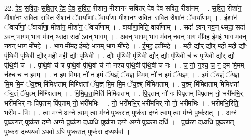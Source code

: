 \documentclass[17pt]{extarticle}
\begin{document}
22. दे॒व॒ स॒वि॒तः॒ स॒वि॒त॒र् दे॒व॒ दे॒व॒ स॒वि॒त॒ रीशा॑न॒ मीशा॑नꣳ सवितर् देव देव सवित॒ रीशा॑नम् । . स॒वि॒त॒ रीशा॑न॒ मीशा॑नꣳ सवितः सवित॒ रीशा॑नं॒ ॅवार्या॑णां॒ ॅवार्या॑णा॒ मीशा॑नꣳ सवितः सवित॒ रीशा॑नं॒ ॅवार्या॑णाम् । . ईशा॑नं॒ ॅवार्या॑णां॒ ॅवार्या॑णा॒ मीशा॑न॒ मीशा॑नं॒ ॅवार्या॑णाम् । . वार्या॑णा॒मिति॒ वार्या॑णाम् । . सदा॑ ऽवन् नव॒न् थ्सदा॒ सदा॑ ऽवन् भा॒गम् भा॒ग म॑व॒न् थ्सदा॒ सदा॑ ऽवन् भा॒गम् । . अ॒व॒न् भा॒गम् भा॒ग म॑वन् नवन् भा॒ग मी॑मह ईमहे भा॒ग म॑वन् नवन् भा॒ग मी॑महे । . भा॒ग मी॑मह ईमहे भा॒गम् भा॒ग मी॑महे । . ई॒म॒ह॒ इती॑महे । . म॒ही द्यौर् द्यौर् म॒ही म॒ही द्यौः पृ॑थि॒वी पृ॑थि॒वी द्यौर् म॒ही म॒ही द्यौः पृ॑थि॒वी । . द्यौः पृ॑थि॒वी पृ॑थि॒वी द्यौर् द्यौः पृ॑थि॒वी च॑ च पृथि॒वी द्यौर् द्यौः पृ॑थि॒वी च॑ । . पृ॒थि॒वी च॑ च पृथि॒वी पृ॑थि॒वी च॑ नो नश्च पृथि॒वी पृ॑थि॒वी च॑ नः । . च॒ नो॒ न॒श्च॒ च॒ न॒ इ॒म मि॒मम् न॑श्च च न इ॒मम् । . न॒ इ॒म मि॒मम् नो॑ न इ॒मं ॅय॒ज्ञ्ं ॅय॒ज्ञ् मि॒मम् नो॑ न इ॒मं ॅय॒ज्ञ्म् । . इ॒मं ॅय॒ज्ञ्ं ॅय॒ज्ञ् मि॒म मि॒मं ॅय॒ज्ञ्म् मि॑मिक्षताम् मिमिक्षतां ॅय॒ज्ञ् मि॒म मि॒मं ॅय॒ज्ञ्म् 
मि॑मिक्षताम् । . य॒ज्ञ्म् मि॑मिक्षताम् मिमिक्षतां ॅय॒ज्ञ्ं ॅय॒ज्ञ्म् मि॑मिक्षताम् । . मि॒मि॒क्ष॒ता॒मिति॑ मिमिक्षताम् । . पि॒पृ॒ताम् नो॑ नः पिपृ॒ताम् पि॑पृ॒ताम् नो॒ भरी॑मभि॒र् भरी॑मभिर् नः पिपृ॒ताम् पि॑पृ॒ताम् नो॒ भरी॑मभिः । . नो॒ भरी॑मभि॒र् भरी॑मभिर् नो नो॒ भरी॑मभिः । . भरी॑मभि॒रिति॒ भरी॑म - भिः॒ । . त्वा म॑ग्ने अग्ने॒ त्वाम् त्वा म॑ग्ने॒ पुष्क॑रा॒त् पुष्क॑रा दग्ने॒ त्वाम् त्वा म॑ग्ने॒ पुष्क॑रात् । . अ॒ग्ने॒ पुष्क॑रा॒त् पुष्क॑रा दग्ने अग्ने॒ पुष्क॑रा॒ दध्यधि॒ पुष्क॑रा दग्ने अग्ने॒ पुष्क॑रा॒ दधि॑ । . पुष्क॑रा॒ दध्यधि॒ पुष्क॑रा॒त् पुष्क॑रा॒ दध्यथ॒र्वा ऽथ॒र्वा ऽधि॒ पुष्क॑रा॒त् पुष्क॑रा॒ दध्यथ॑र्वा । \newline
\end{document}

